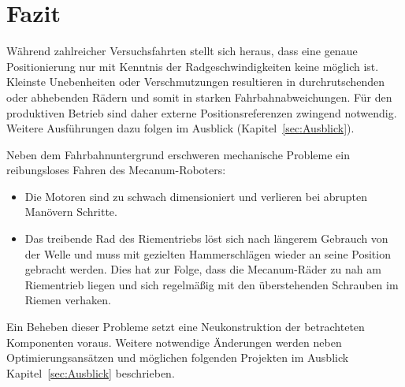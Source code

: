 
\section{Fazit}
\label{sec:Fazit}

Während zahlreicher Versuchsfahrten stellt sich heraus, dass eine genaue Positionierung nur mit Kenntnis der Radgeschwindigkeiten keine möglich ist.
Kleinste Unebenheiten oder Verschmutzungen resultieren in durchrutschenden oder abhebenden Rädern und somit in starken Fahrbahnabweichungen.
Für den produktiven Betrieb sind daher externe Positionsreferenzen zwingend notwendig.
Weitere Ausführungen dazu folgen im Ausblick (Kapitel~\ref{sec:Ausblick}).

Neben dem Fahrbahnuntergrund erschweren mechanische Probleme ein reibungsloses Fahren des Mecanum-Roboters:

\begin{itemize}
    \item{Die Motoren sind zu schwach dimensioniert und verlieren bei abrupten Manövern Schritte.}
    \item{Das treibende Rad des Riementriebs löst sich nach längerem Gebrauch von der Welle und muss mit gezielten Hammerschlägen wieder an seine Position gebracht werden. Dies hat zur Folge, dass die Mecanum-Räder zu nah am Riementrieb liegen und sich regelmäßig mit den überstehenden Schrauben im Riemen verhaken.}
\end{itemize}

Ein Beheben dieser Probleme setzt eine Neukonstruktion der betrachteten Komponenten voraus. Weitere notwendige Änderungen werden neben Optimierungsansätzen und möglichen folgenden Projekten im Ausblick Kapitel~\ref{sec:Ausblick} beschrieben.
